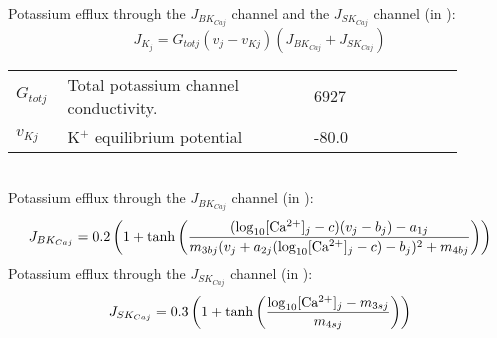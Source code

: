 \\
%
Potassium efflux through the $J_{BK_{Caj}}$ channel and the $J_{SK_{Caj}}$ channel (in \uMs):
\begin{equation} \label{eq:JKj}
J_{K_{j}} = G_{totj} (v_{j}-v_{Kj}) \left(   J_{BK_{Caj}} + J_{SK_{Caj}} \right) 
\end{equation}
%
%
\begin{table}[h!]
\centering
\begin{tabular}{ p{0.09\linewidth}  >{\footnotesize} p{0.5\linewidth}  >{\footnotesize} p{0.27\linewidth} >{\footnotesize} p{0.03\linewidth} }
\hline
$G_{totj}$      		& Total potassium channel conductivity.						 		& 6927 \pS		& \cite{Koenigsberger2006} \\
$v_{Kj}$      			& K$^{+}$ equilibrium potential					 			 		& -80.0 \mV		& \cite{Koenigsberger2006} \\
\hline
\end{tabular}
\label{tab:JKj}
\end{table}
\\
%
Potassium efflux through the $J_{BK_{Caj}}$ channel (in \uMs):
\begin{equation} \label{eq:JBKCAj}
J_{BK_{Caj}} = 0.2 \left(   1+ \tanh \left(   \frac{   (\mathrm{log}_{10} \text{[Ca$^{2+}$]$_j$} - c) (v_{j}-b_{j}) - a_{1j}  }   { m_{3bj} ( v_{j} + a_{2j} (\mathrm{log}_{10} \text{[Ca$^{2+}$]$_j$} -c )-b_{j} )^{2} + m_{4bj} }  \right)     \right)  
\end{equation}
%
Potassium efflux through the $J_{SK_{Caj}}$ channel (in \uMs):
\begin{equation} \label{eq:JSKCaj}
J_{SK_{Caj}} = 0.3\left( 1+ \tanh \left(  \frac{   \mathrm{log}_{10} \text{[Ca$^{2+}$]$_j$} -m_{3sj}  } {m_{4sj}}  \right)      \right) 
\end{equation}
%
